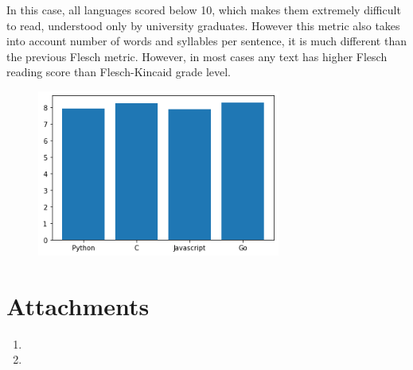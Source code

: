 \documentclass[]{article}
\begin{document}
In this case, all languages scored below 10, which makes them extremely difficult to read, understood only by university graduates. However this metric also takes into account number of words and syllables per sentence, it is much different than the previous Flesch metric. However, in most cases any text has higher Flesch reading score than Flesch-Kincaid grade level.

\begin{figure}[H]
    \includegraphics[width=8cm]{flesh_kincaid.png}
    \centering
\end{figure}

\section{Attachments} \label{attachments}

\begin{enumerate}
    \item %
    \item %
\end{enumerate}
\end{document}
